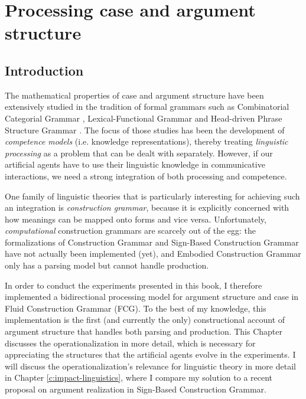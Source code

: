 
\setcounter{chapter}{1}
\chapter{Processing case and argument structure}
\label{c:ar}

\section{Introduction}
The mathematical properties of case and argument structure have been extensively studied in the tradition of formal grammars such as Combinatorial Categorial Grammar \citep[CCG;][]{steedman00syntactic}, Lexical-Functional Grammar \citep[LFG;][]{bresnan82mental} and Head-driven Phrase Structure Grammar \citep[HPSG;][]{sag94hpsg}. The focus of those studies has been the development of {\em competence models} (i.e. knowledge representations), thereby treating {\em linguistic processing} as a problem that can be dealt with separately. However, if our artificial agents have to use their linguistic knowledge in communicative interactions, we need a strong integration of both processing and competence.

One family of linguistic theories that is particularly interesting for achieving such an integration is {\em construction grammar}, because it is explicitly concerned with how meanings can be mapped onto forms and vice versa. Unfortunately, {\em computational} construction grammars are scarcely out of the egg: the formalizations of Construction Grammar \citep[CxG;][]{kay99grammatical} and Sign-Based Construction Grammar \citep[SBCG;][]{boas13sbcg} have not actually been implemented (yet), and Embodied Construction Grammar \citep[ECG,][]{bergen05embodied} only has a parsing model but cannot handle production.

In order to conduct the experiments presented in this book, I therefore implemented a bidirectional processing model for argument structure and case in Fluid Construction Grammar (FCG). To the best of my knowledge, this implementation is the first (and currently the only) constructional account of argument structure that handles both parsing and production. This Chapter discusses the operationalization in more detail, which is necessary for appreciating the structures that the artificial agents evolve in the experiments. I will discuss the operationalization's relevance for linguistic theory in more detail in Chapter \ref{c:impact-linguistics}, where I compare my solution to a recent proposal on argument realization in Sign-Based Construction Grammar. 

